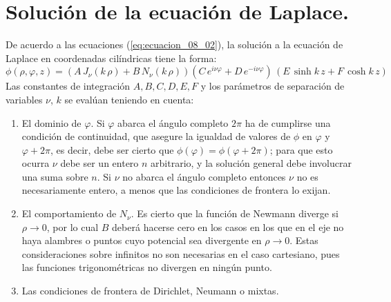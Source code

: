 \section{Solución de la ecuación de Laplace.}
De acuerdo a las ecuaciones (\ref{eq:ecuacion_08_02}), la solución a la ecuación de Laplace en coordenadas cilíndricas tiene la forma:
\[ \phi (\rho, \varphi, z) = (A \, J_{\nu} (k \, \rho) + B \, N_{\nu} (k \, \rho))(C \, e^{i \nu \varphi} + D \, e^{-i \nu \varphi}) \, (E \, \sinh k \, z + F \,  \cosh k \, z)  \]
Las constantes de integración $A, B, C, D, E, F$ y los parámetros de separación de variables $\nu$, $k$ se evalúan teniendo en cuenta:
\begin{enumerate}[label=\textbf{\Alph*})]
\item El dominio de $\varphi$. Si $\varphi$ abarca el ángulo completo $2 \pi$ ha de cumplirse una condición de continuidad, que asegure la igualdad de valores de $\phi$ en $\varphi$ y $\varphi + 2 \pi$, es decir, debe ser cierto que $\phi (\varphi) = \phi (\varphi + 2 \pi)$; para que esto ocurra $\nu$ debe ser un entero $n$ arbitrario, y la solución general debe involucrar una suma sobre $n$. Si $\nu$ no abarca el ángulo completo entonces $\nu$ no es necesariamente entero, a menos que las condiciones de frontera lo exijan.
\item El comportamiento de $N_{\nu}$. Es cierto que la función de Newmann diverge si $\rho \to 0$, por lo cual $B$ deberá hacerse cero en los casos en los que en el eje no haya alambres o puntos cuyo potencial sea divergente en $\rho \to 0$. Estas consideraciones sobre infinitos no son necesarias en el caso cartesiano, pues las funciones trigonométricas no divergen en ningún punto.
\item Las condiciones de frontera de Dirichlet, Neumann o mixtas.
\end{enumerate}
